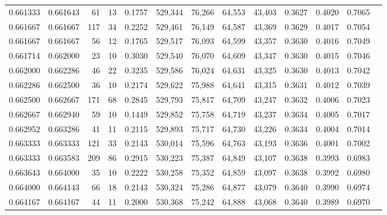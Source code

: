 \begin{tabular}{rrrrrrrrrrrrr}
0.661333 & 0.661643 &    61 &  13 &                                     0.1757 & 529,344 &  76,266 &  64,553 &  43,403 & 0.3627 & 0.4020 & 0.7065 \\
0.661667 & 0.661667 &   117 &  34 &                                     0.2252 & 529,461 &  76,149 &  64,587 &  43,369 & 0.3629 & 0.4017 & 0.7054 \\
0.661667 & 0.661667 &    56 &  12 &                                     0.1765 & 529,517 &  76,093 &  64,599 &  43,357 & 0.3630 & 0.4016 & 0.7049 \\
0.661714 & 0.662000 &    23 &  10 &                                     0.3030 & 529,540 &  76,070 &  64,609 &  43,347 & 0.3630 & 0.4015 & 0.7046 \\
0.662000 & 0.662286 &    46 &  22 &                                     0.3235 & 529,586 &  76,024 &  64,631 &  43,325 & 0.3630 & 0.4013 & 0.7042 \\
0.662286 & 0.662500 &    36 &  10 &                                     0.2174 & 529,622 &  75,988 &  64,641 &  43,315 & 0.3631 & 0.4012 & 0.7039 \\
0.662500 & 0.662667 &   171 &  68 &                                     0.2845 & 529,793 &  75,817 &  64,709 &  43,247 & 0.3632 & 0.4006 & 0.7023 \\
0.662667 & 0.662940 &    59 &  10 &                                     0.1449 & 529,852 &  75,758 &  64,719 &  43,237 & 0.3634 & 0.4005 & 0.7017 \\
0.662952 & 0.663286 &    41 &  11 &                                     0.2115 & 529,893 &  75,717 &  64,730 &  43,226 & 0.3634 & 0.4004 & 0.7014 \\
0.663333 & 0.663333 &   121 &  33 &                                     0.2143 & 530,014 &  75,596 &  64,763 &  43,193 & 0.3636 & 0.4001 & 0.7002 \\
0.663333 & 0.663583 &   209 &  86 &                                     0.2915 & 530,223 &  75,387 &  64,849 &  43,107 & 0.3638 & 0.3993 & 0.6983 \\
0.663643 & 0.664000 &    35 &  10 &                                     0.2222 & 530,258 &  75,352 &  64,859 &  43,097 & 0.3638 & 0.3992 & 0.6980 \\
0.664000 & 0.664143 &    66 &  18 &                                     0.2143 & 530,324 &  75,286 &  64,877 &  43,079 & 0.3640 & 0.3990 & 0.6974 \\
0.664167 & 0.664167 &    44 &  11 &                                     0.2000 & 530,368 &  75,242 &  64,888 &  43,068 & 0.3640 & 0.3989 & 0.6970 \\

\end{tabular}
